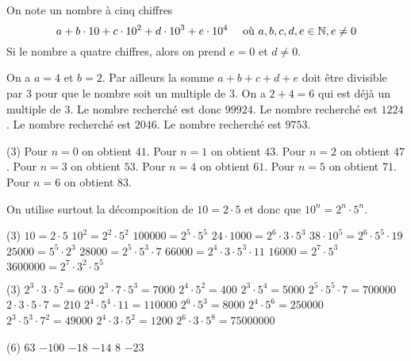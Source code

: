 \documentclass[a4paper,12pt]{report}
\begin{document}
\vspace*{-2\baselineskip}

\begin{core}
	On note un nombre à cinq chiffres  \[a+b\cdot 10+c\cdot 10^2+d\cdot 10^3+e\cdot 10^4 \quad\text{ où } a,b,c,d,e\in \mathbb N, e\neq 0\]
	Si le nombre a quatre chiffres, alors on prend $e=0$ et $d\neq 0$.

	\begin{tasks}
	\task On a $a=4$ et $b=2$. Par ailleurs la somme $a+b+c+d+e$ doit être divisible par $3$ pour que le nombre soit un multiple de $3$. On a $2+4=6$ qui est déjà un multiple de $3$. Le nombre recherché est donc $99924$. 
	\task Le nombre recherché est $1224$.
	\task Le nombre recherché est $2046$.
	\task Le nombre recherché est $9753$.
	\end{tasks}
\end{core}
\begin{core}
	\phantom{.}
	\begin{tasks}(3)
		\task[] Pour $n=0$ on obtient $41$.	
		\task[] Pour $n=1$ on obtient $43$.	
		\task[] Pour $n=2$ on obtient $47$.	
		\task[] Pour $n=3$ on obtient $53$.	
		\task[] Pour $n=4$ on obtient $61$.	
		\task[] Pour $n=5$ on obtient $71$.	
		\task[] Pour $n=6$ on obtient $83$.	
	\end{tasks}
\end{core}
\begin{core}
	On utilise surtout la décomposition de $10=2\cdot 5$ et donc que $10^n=2^n\cdot 5^n$.
	\begin{tasks}(3)
\task $10=2\cdot 5$
\task $10^2=2^2\cdot 5^2$
\task $100000=2^5\cdot 5^5$
\task $24 \cdot 1000=2^6\cdot 3\cdot 5^3$
\task $38 \cdot 10^5=2^6\cdot 5^5\cdot 19$
\task $25000=5^5\cdot 2^3$
\task $28000= 2^5\cdot 5^3\cdot 7$
\task $66000=2^4\cdot 3\cdot 5^3\cdot 11$
\task $16000=2^7\cdot 5^3$
\task $3600000=2^7\cdot 3^2\cdot 5^5$
	\end{tasks}
\end{core}
\begin{core}
	\phantom{.}
\begin{tasks}(3)
\task $2^3 \cdot 3 \cdot 5^2=600$
\task $2^3 \cdot 7 \cdot 5^3=7000$
\task $2^4 \cdot 5^2=400$
\task $2^3 \cdot 5^4=5000$
\task $2^5 \cdot 5^5 \cdot 7=700000$
\task $2 \cdot 3 \cdot 5 \cdot 7=210$
\task $2^4 \cdot 5^4 \cdot 11=110000$
\task $2^6 \cdot 5^3=8000$
\task $2^4 \cdot 5^6=250000$
\task $2^3 \cdot 5^3 \cdot 7^2=49000$
\task $2^4 \cdot 3 \cdot 5^2=1200$
\task $2^6 \cdot 3 \cdot 5^8=75000000$
\end{tasks}
\end{core}
\begin{cora}\phantom{ }

\begin{tasks}(6)
\task $63$
\task $-100$
\task $-18$
\task $-14$
\task $8$
\task $-23$
\end{tasks}

\end{cora}
\end{document}
